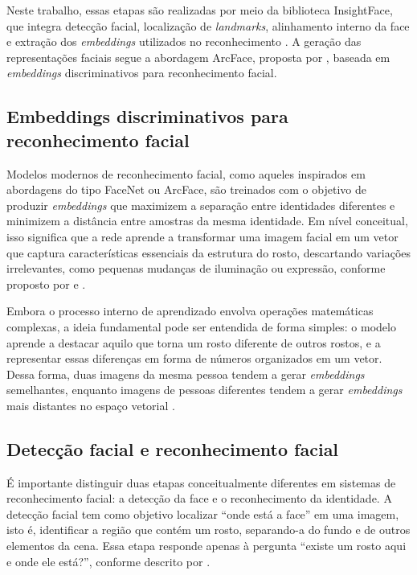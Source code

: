 Neste trabalho, essas etapas são realizadas por meio da biblioteca InsightFace, que integra detecção facial, localização de \textit{landmarks}, alinhamento interno da face e extração dos \textit{embeddings} utilizados no reconhecimento \cite{insightface_repo}. A geração das representações faciais segue a abordagem ArcFace, proposta por \textcite{deng2019arcface}, baseada em \textit{embeddings} discriminativos para reconhecimento facial.

\subsection{Embeddings discriminativos para reconhecimento facial}

Modelos modernos de reconhecimento facial, como aqueles inspirados em abordagens do tipo FaceNet ou ArcFace, são treinados com o objetivo de produzir \textit{embeddings} que maximizem a separação entre identidades diferentes e minimizem a distância entre amostras da mesma identidade. Em nível conceitual, isso significa que a rede aprende a transformar uma imagem facial em um vetor que captura características essenciais da estrutura do rosto, descartando variações irrelevantes, como pequenas mudanças de iluminação ou expressão, conforme proposto por \textcite{schroff2015facenet} e \textcite{deng2019arcface}.

Embora o processo interno de aprendizado envolva operações matemáticas complexas, a ideia fundamental pode ser entendida de forma simples: o modelo aprende a destacar aquilo que torna um rosto diferente de outros rostos, e a representar essas diferenças em forma de números organizados em um vetor. Dessa forma, duas imagens da mesma pessoa tendem a gerar \textit{embeddings} semelhantes, enquanto imagens de pessoas diferentes tendem a gerar \textit{embeddings} mais distantes no espaço vetorial \cite{schroff2015facenet, deng2019arcface}.

\subsection{Detecção facial e reconhecimento facial}

É importante distinguir duas etapas conceitualmente diferentes em sistemas de reconhecimento facial: a detecção da face e o reconhecimento da identidade. A detecção facial tem como objetivo localizar “onde está a face” em uma imagem, isto é, identificar a região que contém um rosto, separando-a do fundo e de outros elementos da cena. Essa etapa responde apenas à pergunta “existe um rosto aqui e onde ele está?”, conforme descrito por \textcite{zhao2003face}.

